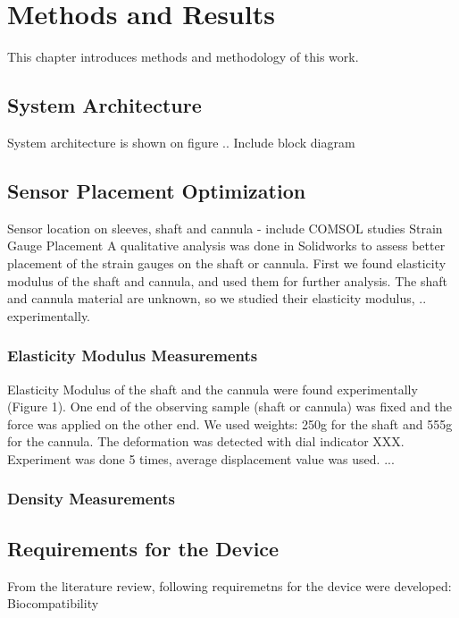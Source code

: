 
\chapter{Methods and Results}
\label{methods} %

This chapter introduces methods and methodology of this work.

\section{System Architecture}
\label{sec:sysArch}
System architecture is shown on figure .. Include block diagram

\section{Sensor Placement Optimization}
\label{sec:SimMod}

	Sensor location on sleeves, shaft and cannula - include COMSOL studies
	Strain Gauge Placement
	A qualitative analysis was done in Solidworks to assess better placement of the strain gauges on the shaft or cannula. First we found elasticity modulus of the shaft and cannula, and used them for further analysis.
	The shaft and cannula material are unknown, so we studied their elasticity modulus, .. experimentally.

	\subsection{Elasticity Modulus Measurements}
	\label{sec:ElasMod}
	Elasticity Modulus of the shaft and the cannula were found experimentally (Figure 1). One end of the observing sample (shaft or cannula) was fixed and the force was applied on the other end. We used weights: 250g for the shaft and 555g for the cannula. The deformation was detected with dial indicator XXX. Experiment was done 5 times, average displacement value was used.
	...
	\subsection{Density Measurements}
	\label{sec:DenMeas}

\section{Requirements for the Device}
	\label{sec:DevReq}
	From the literature review, following requiremetns for the device were developed:
	Biocompatibility
	

